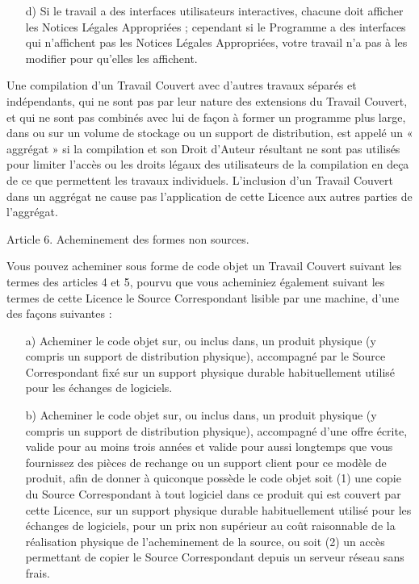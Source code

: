 {\begin{enumerate}
\item [d)] Si le travail a des interfaces utilisateurs interactives, chacune
     doit afficher les Notices Légales Appropriées ; cependant si le
     Programme a des interfaces qui n’affichent pas les Notices Légales
     Appropriées, votre travail n’a pas à les modifier pour qu’elles
     les affichent.
\end{enumerate}

Une compilation d’un Travail Couvert avec d’autres travaux séparés et
indépendants, qui ne sont pas par leur nature des extensions du Travail
Couvert, et qui ne sont pas combinés avec lui de façon à former un
programme plus large, dans ou sur un volume de stockage ou un support
de distribution, est appelé un « aggrégat » si la compilation et son
Droit d’Auteur résultant ne sont pas utilisés pour limiter l’accès ou
les droits légaux des utilisateurs de la compilation en deça de ce que
permettent les travaux individuels. L’inclusion d’un Travail Couvert
dans un aggrégat ne cause pas l’application de cette Licence aux
autres parties de l’aggrégat.


Article 6. Acheminement des formes non sources.

Vous pouvez acheminer sous forme de code objet un Travail Couvert
suivant les termes des articles 4 et 5, pourvu que vous acheminiez
également suivant les termes de cette Licence le Source Correspondant
lisible par une machine, d’une des façons suivantes :
\begin{enumerate}
\item [a)]  Acheminer le code objet sur, ou inclus dans, un produit physique
     (y compris un support de distribution physique), accompagné par le
     Source Correspondant fixé sur un support physique durable
     habituellement utilisé pour les échanges de logiciels.

\item [b)]  Acheminer le code objet sur, ou inclus dans, un produit physique
     (y compris un support de distribution physique), accompagné d’une
     offre écrite, valide pour au moins trois années et valide pour
     aussi longtemps que vous fournissez des pièces de rechange ou un
     support client pour ce modèle de produit, afin de donner à
     quiconque possède le code objet soit (1) une copie du Source
     Correspondant à tout logiciel dans ce produit qui est couvert par
     cette Licence, sur un support physique durable habituellement
     utilisé pour les échanges de logiciels, pour un prix non supérieur
     au coût raisonnable de la réalisation physique de l’acheminement
     de la source, ou soit (2) un accès permettant de copier le Source
     Correspondant depuis un serveur réseau sans frais.


\end{enumerate}}
